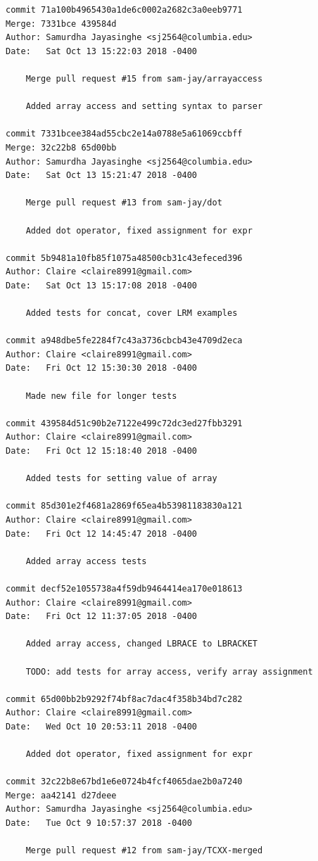 \documentclass[12pt]{article}
\begin{document}
\begin{lstlisting}
commit 71a100b4965430a1de6c0002a2682c3a0eeb9771
Merge: 7331bce 439584d
Author: Samurdha Jayasinghe <sj2564@columbia.edu>
Date:   Sat Oct 13 15:22:03 2018 -0400

    Merge pull request #15 from sam-jay/arrayaccess
    
    Added array access and setting syntax to parser

commit 7331bcee384ad55cbc2e14a0788e5a61069ccbff
Merge: 32c22b8 65d00bb
Author: Samurdha Jayasinghe <sj2564@columbia.edu>
Date:   Sat Oct 13 15:21:47 2018 -0400

    Merge pull request #13 from sam-jay/dot
    
    Added dot operator, fixed assignment for expr

commit 5b9481a10fb85f1075a48500cb31c43efeced396
Author: Claire <claire8991@gmail.com>
Date:   Sat Oct 13 15:17:08 2018 -0400

    Added tests for concat, cover LRM examples

commit a948dbe5fe2284f7c43a3736cbcb43e4709d2eca
Author: Claire <claire8991@gmail.com>
Date:   Fri Oct 12 15:30:30 2018 -0400

    Made new file for longer tests

commit 439584d51c90b2e7122e499c72dc3ed27fbb3291
Author: Claire <claire8991@gmail.com>
Date:   Fri Oct 12 15:18:40 2018 -0400

    Added tests for setting value of array

commit 85d301e2f4681a2869f65ea4b53981183830a121
Author: Claire <claire8991@gmail.com>
Date:   Fri Oct 12 14:45:47 2018 -0400

    Added array access tests

commit decf52e1055738a4f59db9464414ea170e018613
Author: Claire <claire8991@gmail.com>
Date:   Fri Oct 12 11:37:05 2018 -0400

    Added array access, changed LBRACE to LBRACKET
    
    TODO: add tests for array access, verify array assignment

commit 65d00bb2b9292f74bf8ac7dac4f358b34bd7c282
Author: Claire <claire8991@gmail.com>
Date:   Wed Oct 10 20:53:11 2018 -0400

    Added dot operator, fixed assignment for expr

commit 32c22b8e67bd1e6e0724b4fcf4065dae2b0a7240
Merge: aa42141 d27deee
Author: Samurdha Jayasinghe <sj2564@columbia.edu>
Date:   Tue Oct 9 10:57:37 2018 -0400

    Merge pull request #12 from sam-jay/TCXX-merged
    

\end{lstlisting}
\end{document}
